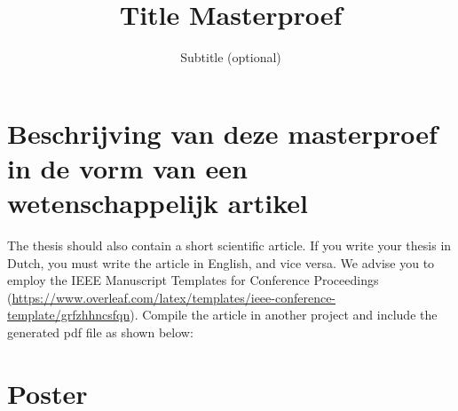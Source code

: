 \documentclass[11pt,a4paper,twoside,openright]{report}
\title{Title Masterproef}
\subtitle{Subtitle (optional)}
\begin{document}
\preface%

\printnoidxglossary[type=\acronymtype]%
\clearpage


%
%
%

\printbibliography


\appendix


\chapter{Beschrijving van deze masterproef in de vorm van een wetenschappelijk artikel}
The thesis should also contain a short scientific article. If you write your thesis in Dutch, you must write the article in English, and vice versa. We advise you to employ the IEEE Manuscript Templates for Conference Proceedings (\url{https://www.overleaf.com/latex/templates/ieee-conference-template/grfzhhncsfqn}).
Compile the article in another project and include the generated pdf file as shown below:



\chapter{Poster}
%


\end{document}
